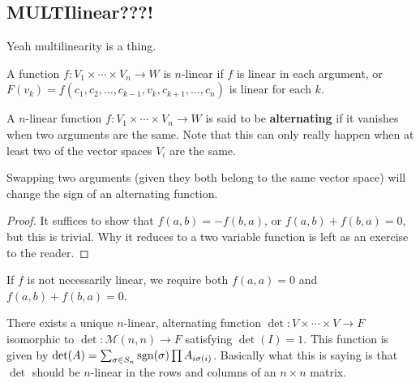 \subsection{MULTIlinear???!}
Yeah multilinearity is a thing.

\begin{df}
A function $f : V_1 \times \cdots \times V_n \rightarrow W$ is
$n$-linear if $f$ is linear in each argument, or $F(v_k) = f(c_1, c_2,
\dots, c_{k - 1}, v_k, c_{k + 1}, \dots, c_n)$ is linear for each $k$.
\end{df}

\begin{df}
A $n$-linear function $f : V_1 \times \cdots \times V_n \rightarrow W$
is said to be \textbf{alternating} if it vanishes when two arguments are
the same.  Note that this can only really happen when at least two of
the vector spaces $V_i$ are the same.
\end{df}

\begin{prop}
Swapping two arguments (given they both belong to the same vector space)
will change the sign of an alternating function.
\end{prop}

\begin{proof}
It suffices to show that $f(a, b) = -f(b, a)$, or $f(a, b) + f(b, a) =
0$, but this is trivial. Why it reduces to a two variable function is
left as an exercise to the reader.
\end{proof}

\begin{rem}
If $f$ is not necessarily linear, we require both $f(a, a) = 0$ and
$f(a, b) + f(b, a) = 0$.
\end{rem}

\begin{thm}
There exists a unique $n$-linear, alternating function $\det : V \times
\cdots \times V \rightarrow F$ isomorphic to $\det : \mathcal{M}(n, n)
\rightarrow F$ satisfying $\det(I) = 1$. This function is given by
$\det(A) = \sum_{\sigma \in S_n} \operatorname{sgn}(\sigma) \prod A_{i \sigma(i)}$.
Basically what this is saying is that $\det$ should be $n$-linear in the
rows and columns of an $n \times n$ matrix.
\end{thm}

